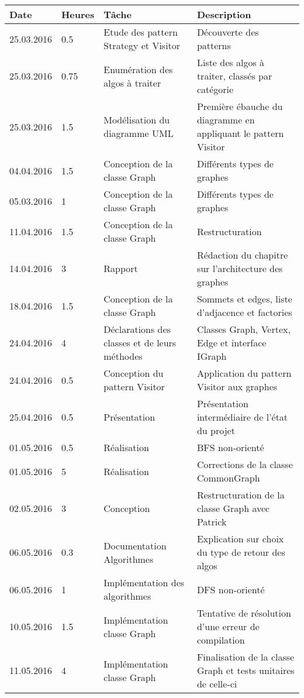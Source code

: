 \documentclass[french]{article}
\begin{document}
	\begin{tabular}{p{}|p{}|p{}|p{}}
		Date&Heures&Tâche&Description\\
		\hline \hline
		25.03.2016&0.5&Etude des pattern Strategy et Visitor&Découverte des patterns\\
		\hline
		25.03.2016&0.75&Enumération des algos à traiter&Liste des algos à traiter, classés par catégorie\\
		\hline
		25.03.2016&1.5&Modélisation du diagramme UML&Première ébauche du diagramme en appliquant le pattern Visitor\\
		\hline
		04.04.2016&1.5&Conception de la classe Graph&Différents types de graphes\\
		\hline
		05.03.2016&1&Conception de la classe Graph&Différents types de graphes\\
		\hline
		11.04.2016&1.5&Conception de la classe Graph&Restructuration\\
		\hline
		14.04.2016&3&Rapport&Rédaction du chapitre sur l'architecture des graphes\\
		\hline
		18.04.2016&1.5&Conception de la classe Graph&Sommets et edges, liste d'adjacence et factories\\
		\hline
		24.04.2016&4&Déclarations des classes et de leurs méthodes&Classes Graph, Vertex, Edge et interface IGraph\\
		\hline
		24.04.2016&0.5&Conception du pattern Visitor&Application du pattern Visitor aux graphes\\
		\hline
		25.04.2016 & 0.5 & Présentation & Présentation intermédiaire de l'état du projet\\
		\hline
		01.05.2016 & 0.5 & Réalisation & BFS non-orienté\\
		\hline
		01.05.2016 & 5 & Réalisation & Corrections de la classe CommonGraph\\
		\hline
		02.05.2016 & 3 & Conception & Restructuration de la classe Graph avec Patrick\\
		\hline
		06.05.2016 & 0.3 & Documentation Algorithmes & Explication sur choix du type de retour des algos\\
		\hline
		06.05.2016 & 1 & Implémentation des algorithmes & DFS non-orienté\\
		\hline
		10.05.2016 & 1.5 & Implémentation classe Graph & Tentative de résolution d'une erreur de compilation\\
		\hline
		11.05.2016 & 4 & Implémentation classe Graph & Finalisation de la classe Graph et tests unitaires de celle-ci \\
		\hline
	\end{tabular}
	
\end{document}
